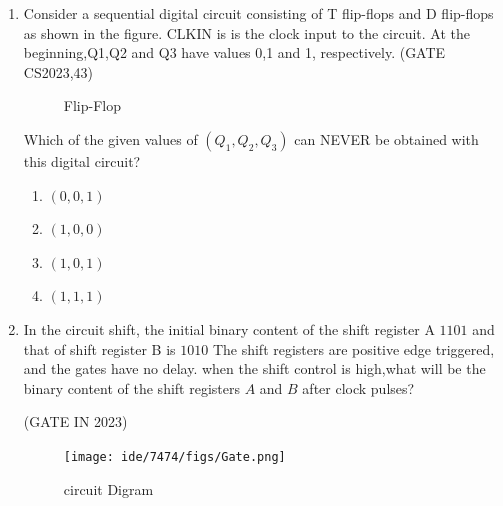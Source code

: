 \begin{enumerate}
\item 
Consider a sequential digital circuit consisting of T flip-flops and D flip-flops as shown in the figure. CLKIN is is the clock input to the circuit. At the beginning,Q1,Q2 and Q3 have values 0,1 and 1, respectively.
\hfill(GATE CS2023,43)

\begin{figure}[H]
\centering

\caption{Flip-Flop}
\label{fig:Flip-Flop}
\end{figure}
Which of the given values of \((Q_1, Q_2, Q_3)\) can NEVER be obtained with this digital circuit?
\begin{enumerate}
    
    \item ${(0,0,1)}$
    \item ${(1,0,0)}$
    \item ${(1,0,1)}$
    \item ${(1,1,1)}$
\end{enumerate}
\item In the circuit shift, the initial binary content of the shift register A $1101$ and that of shift register B is $1010$ The shift registers are positive edge triggered, and the gates have no delay.
when the shift control is high,what will be the binary content of the shift registers $A$ and $B$ after clock pulses?

\hfill{(GATE IN 2023)}

\begin{figure}[H]
\centering
\texttt{[image: ide/7474/figs/Gate.png]}
\caption{circuit Digram}
\label{fig:cricuit Digram}
\end{figure}


\end{enumerate}
